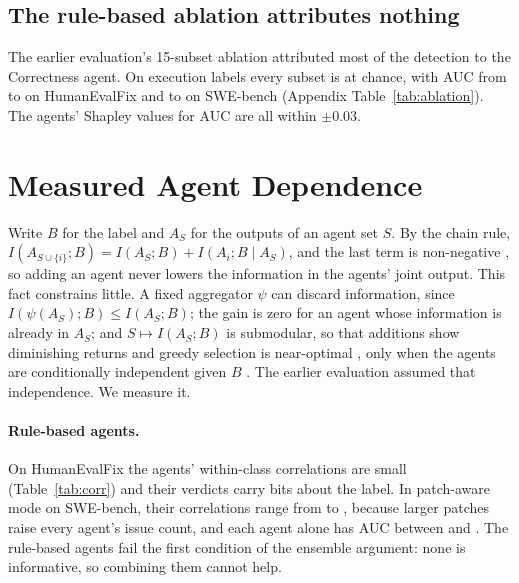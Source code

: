 \subsection{The rule-based ablation attributes nothing}

The earlier evaluation's 15-subset ablation attributed most of the detection to the Correctness agent. On execution labels every subset is at chance, with AUC from \nHefAblWorst{} to \nHefAblBest{} on HumanEvalFix and \nSweAblWorst{} to \nSweAblBest{} on SWE-bench (Appendix Table~\ref{tab:ablation}). The agents' Shapley values for AUC are all within $\pm0.03$.

\section{Measured Agent Dependence}
\label{sec:dependence}

Write $B$ for the label and $A_S$ for the outputs of an agent set $S$. By the chain rule, $I(A_{S\cup\{i\}};B)=I(A_S;B)+I(A_i;B\mid A_S)$, and the last term is non-negative \citep{cover2006elements}, so adding an agent never lowers the information in the agents' joint output. This fact constrains little. A fixed aggregator $\psi$ can discard information, since $I(\psi(A_S);B)\le I(A_S;B)$; the gain is zero for an agent whose information is already in $A_S$; and $S\mapsto I(A_S;B)$ is submodular, so that additions show diminishing returns and greedy selection is near-optimal \citep{nemhauser1978analysis}, only when the agents are conditionally independent given $B$ \citep{krause2005nearoptimal}. The earlier evaluation assumed that independence. We measure it.

\begin{table}[t]
\centering
\footnotesize

\caption{Agent dependence. Top: Spearman correlation between two agents' scores within correct / within incorrect items. Bottom: plug-in mutual information (bits) between the agents' binary verdicts and the label, for nested agent sets. Rule-based agents: CodeX-Verify (patch-aware on SWE-bench); LLM agents: Sonnet 5.5. HEF: HumanEvalFix; SWE: agent patches.}
\label{tab:corr}
\end{table}

\paragraph{Rule-based agents.}
On HumanEvalFix the agents' within-class correlations are small (Table~\ref{tab:corr}) and their verdicts carry \nStaticHefMiAll{} bits about the label. In patch-aware mode on SWE-bench, their correlations range from \nPaRhoMin{} to \nPaRhoMax{}, because larger patches raise every agent's issue count, and each agent alone has AUC between \nPaAgentAucMin{} and \nPaAgentAucMax. The rule-based agents fail the first condition of the ensemble argument: none is informative, so combining them cannot help.

